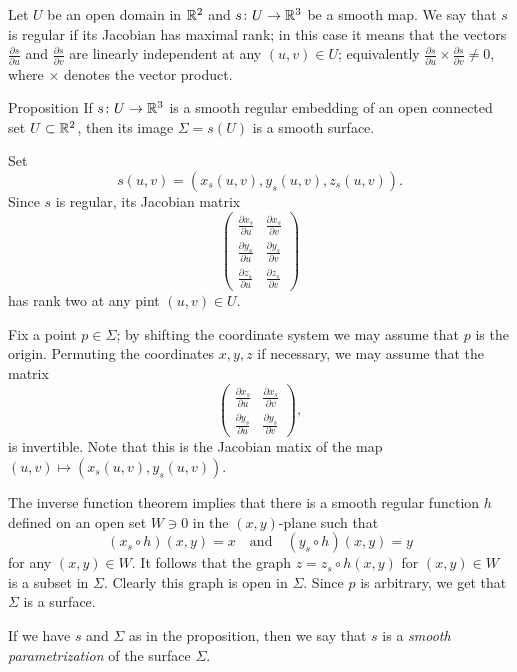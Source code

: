 Let $U$ be an open domain in $\mathbb{R}^2$ and $s\colon U\to \mathbb{R}^3$ be a smooth map.
We say that $s$ is regular if its Jacobian has maximal rank;
in this case it means that the vectors $\tfrac{\partial s}{\partial u}$ and $\tfrac{\partial s}{\partial v}$ are linearly independent at any $(u,v)\in U$;
equivalently $\tfrac{\partial s}{\partial u}\times\tfrac{\partial s}{\partial v}\ne 0$, where $\times$ denotes the vector product.

\begin{thm}{Proposition}\label{prop:graph-chart}
If $s\colon U\to \mathbb{R}^3$ is a smooth regular embedding %
of an open connected set $U\subset \mathbb{R}^2$, then its image $\Sigma=s(U)$ is a smooth surface.
\end{thm}

Set 
\[s(u,v)=(x_s(u,v),y_s(u,v),z_s(u,v)).\]
Since $s$ is regular, its Jacobian matrix
\[
\renewcommand\arraystretch{1.3}
\begin{pmatrix}
\tfrac{\partial x_s}{\partial u}&\tfrac{\partial x_s}{\partial v}\\
\tfrac{\partial y_s}{\partial u}&\tfrac{\partial y_s}{\partial v}\\
\tfrac{\partial z_s}{\partial u}&\tfrac{\partial z_s}{\partial v}
\end{pmatrix}
\]
has rank two at any pint $(u,v)\in U$.

Fix a point $p\in \Sigma$; by shifting the coordinate system we may assume that $p$ is the origin.
Permuting the coordinates $x,y,z$ if necessary, we may assume that 
the matrix 
\[
\renewcommand\arraystretch{1.3}
\begin{pmatrix}
\tfrac{\partial x_s}{\partial u}&\tfrac{\partial x_s}{\partial v}\\
\tfrac{\partial y_s}{\partial u}&\tfrac{\partial y_s}{\partial v}
\end{pmatrix},
\] 
is invertible.
Note that this is the Jacobian matix of the map $(u,v)\mapsto (x_s(u,v),y_s(u,v))$.

The inverse function theorem implies that there is a smooth regular function $h$ defined on an open set $W\ni 0$ in the $(x,y)$-plane
such that 
\[(x_s\circ h)(x,y)=x\quad\text{and}\quad (y_s\circ h)(x,y)=y\]
for any $(x,y)\in W$.
It follows that the graph $z=z_s\circ h(x,y)$ for $(x,y)\in W$ is a subset in $\Sigma$.
Clearly this graph is open in $\Sigma$. %
Since $p$ is arbitrary, we get that $\Sigma$ is a surface.
\qeds

If we have $s$ and $\Sigma$ as in the proposition, then we say that $s$ is a \emph{smooth parametrization} of the surface $\Sigma$. 

